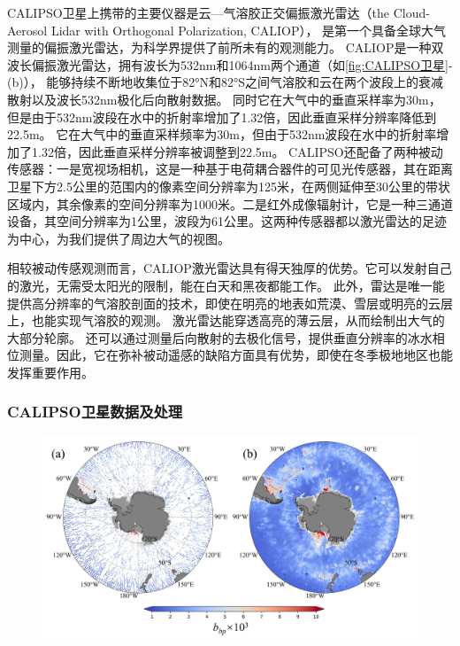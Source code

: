 CALIPSO卫星上携带的主要仪器是云—气溶胶正交偏振激光雷达（the Cloud-Aerosol Lidar with Orthogonal Polarization, CALIOP），
是第一个具备全球大气测量的偏振激光雷达，为科学界提供了前所未有的观测能力。
CALIOP是一种双波长偏振激光雷达，拥有波长为532nm和1064nm两个通道（如\autoref{fig:CALIPSO卫星}-(b)），
能够持续不断地收集位于82°N和82°S之间气溶胶和云在两个波段上的衰减散射以及波长532nm极化后向散射数据\cite{CALIPSO_2009}。
同时它在大气中的垂直采样率为30m，但是由于532nm波段在水中的折射率增加了1.32倍，因此垂直采样分辨率降低到22.5m。
它在大气中的垂直采样频率为30m，但由于532nm波段在水中的折射率增加了1.32倍，因此垂直采样分辨率被调整到22.5m。
CALIPSO还配备了两种被动传感器：一是宽视场相机，这是一种基于电荷耦合器件的可见光传感器，其在距离卫星下方2.5公里的范围内的像素空间分辨率为125米，在两侧延伸至30公里的带状区域内，其余像素的空间分辨率为1000米。二是红外成像辐射计，它是一种三通道设备，其空间分辨率为1公里，波段为61公里。这两种传感器都以激光雷达的足迹为中心，为我们提供了周边大气的视图。

相较被动传感观测而言，CALIOP激光雷达具有得天独厚的优势。它可以发射自己的激光，无需受太阳光的限制，能在白天和黑夜都能工作。
此外，雷达是唯一能提供高分辨率的气溶胶剖面的技术，即使在明亮的地表如荒漠、雪层或明亮的云层上，也能实现气溶胶的观测。
激光雷达能穿透高亮的薄云层，从而绘制出大气的大部分轮廓。
还可以通过测量后向散射的去极化信号，提供垂直分辨率的冰水相位测量\cite{CALIPSO_2009,winker2003accounting}。因此，它在弥补被动遥感的缺陷方面具有优势，即使在冬季极地地区也能发挥重要作用。

\subsubsection{CALIPSO卫星数据及处理}
\begin{figure}[htbp]
    \centering
    \includegraphics[width=\linewidth]{figure/第二章用图/图2-bbp处理.jpg}
\end{figure}

